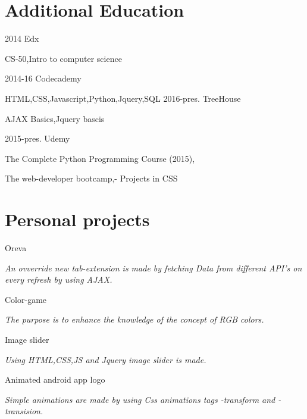 \documentclass[]{friggeri-cv}
\begin{document}
\section{Additional Education}

\begin{entrylist}
    \entry
    {2014}
    {Edx}
    
    {CS-50,Intro to computer science}
    
   \entry
    {2014-16}
    {Codecademy}
    
    {HTML,CSS,Javascript,Python,Jquery,SQL}
    \entry
    {2016-pres.}
    {TreeHouse}
    
    {AJAX Basics,Jquery bascis}
 
  \entry
    {2015-pres.}
    {Udemy}
     
   { {The Complete Python Programming Course (2015),}
  
    {The web-developer bootcamp,- Projects in CSS}}
\end{entrylist}


\section{Personal projects}


\entry
    
    {Oreva}
     
    {\emph{An ovverride new tab-extension is made by fetching Data from different API's on every refresh by using AJAX.}}
    \entry
    
    {Color-game}
    
    {\emph{The purpose is to enhance  the knowledge of the concept of RGB colors.}}
    
    \entry
    
    {Image slider}
   
    {\emph{Using HTML,CSS,JS and Jquery image slider is made. }}
    
    \entry
    
    {Animated android app logo}
 
    {\emph{Simple animations are made by using Css animations tags -transform and -transision.}}

% 
\end{document}
